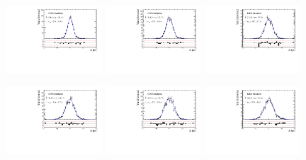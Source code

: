 \begin{figure}[h]
\centering
\includegraphics[height=!,width=0.32\textwidth]{figs/Resolution/SignalMC_bin_1.pdf}
\includegraphics[height=!,width=0.32\textwidth]{figs/Resolution/SignalMC_bin_2.pdf}
\includegraphics[height=!,width=0.32\textwidth]{figs/Resolution/SignalMC_bin_3.pdf}

\includegraphics[height=!,width=0.32\textwidth]{figs/Resolution/SignalMC_bin_4.pdf}
\includegraphics[height=!,width=0.32\textwidth]{figs/Resolution/SignalMC_bin_5.pdf}
\includegraphics[height=!,width=0.32\textwidth]{figs/Resolution/SignalMC_bin_6.pdf}


\end{figure}
